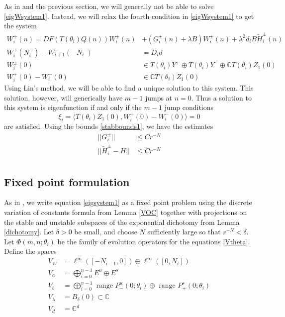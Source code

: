 \documentclass[12pt]{elsarticle}
\def\C{{\mathbb C}}
\begin{document}
As in \cite{Sandstede1998} and the previous section, we will generally not be able to solve \eqref{eigWsystem1}. Instead, we will relax the fourth condition in \eqref{eigWsystem1} to get the system
\begin{align}
W_i^\pm(n) = DF(T(\theta_i) Q(n) ) W_i^\pm(n) &+ (G_i^\pm(n) + \lambda B) W_i^\pm(n) + \lambda^2 d_i B \tilde{H}_i^\pm(n) \label{eigsystem1} \\
W_i^+(N_i^+) - W_{i+1}^-(-N_i^-) &= D_i d \label{eigsystem2} \\
W_i^\pm(0) &\in T(\theta_i) Y^+ \oplus T(\theta_i) Y^- \oplus \C T(\theta_i) Z_1(0) \label{eigsystem3a} \\
W_i^+(0) - W_i^-(0) &\in \C T(\theta_i) Z_1(0) \label{eigsystem3b} 
\end{align}
Using Lin's method, we will be able to find a unique solution to this system. This solution, however, will generically have $m-1$ jumps at $n = 0$. Thus a solution to this system is eigenfunction if and only if the $m-1$ jump conditions
\begin{equation*}
\xi_i = \langle T(\theta_i) Z_1(0), W_i^+(0) - W_i^-(0) \rangle = 0
\end{equation*}
are satisfied. Using the bounds \eqref{stabbounds1}, we have the estimates
\begin{equation}\label{stabbounds2}
\begin{aligned}
||G_i^\pm|| &\leq C r^{-N} \\
||\tilde{H}_i^\pm - H|| &\leq C r^{-N} \\
\end{aligned}
\end{equation}

\subsection{Fixed point formulation}

As in \cite{Sandstede1998}, we write equation \eqref{eigsystem1} as a fixed point problem using the discrete variation of constants formula from Lemma \ref{VOC} together with projections on the stable and unstable subspaces of the exponential dichotomy from Lemma \ref{dichotomy}. Let $\delta > 0$ be small, and choose $N$ sufficiently large so that $r^{-N} < \delta$. Let $\Phi(m, n; \theta_i)$ be the family of evolution operators for the equations \eqref{Vtheta}. Define the spaces
\begin{align*}
V_W &= \ell^\infty([-N_{i-1}, 0]) \oplus \ell^\infty([0, N_i])  \\
V_a &= \bigoplus_{i=0}^{n-1} E^u \oplus E^s \\
V_b &= \bigoplus_{i=0}^{n-1} 
\text{ range } P_-^u(0; \theta_i) \oplus \text{ range } P_+^s(0; \theta_i)\\
V_\lambda &= B_\delta(0) \subset \C \\
V_d &= \C^d
\end{align*}
\end{document}
